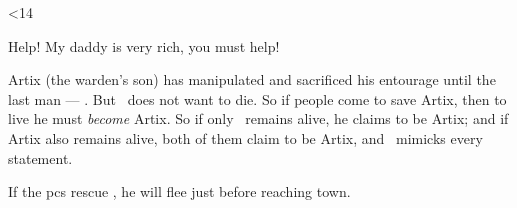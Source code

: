 \documentclass[10pt,twoside]{book}
\begin{document}
\ifnum\thepage<14
  \begin{speechtext}
    Help!
    My daddy is very rich, you must help!
  \end{speechtext}
\fi

Artix (the \gls{warden}'s son) has manipulated and sacrificed his entourage until the last man --- \composeHumanName.
But \currentName\ does not want to die.
So if people come to save Artix, then to live he must \emph{become} Artix.
So if only \currentName\ remains alive, he claims to be Artix; and if Artix also remains alive, both of them claim to be Artix, and \currentName\ mimicks every statement.

If the \glspl{pc} rescue \currentName, he will flee just before reaching town.
\end{document}
